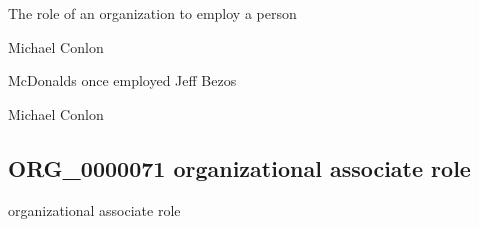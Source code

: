 \documentclass[letterpaper,10pt,english]{sphinxmanual}
\begin{document}
\begin{sphinxShadowBox}

\sphinxAtStartPar
{\hyperref[\detokenize{doc-BFO_0000023::doc}]{}}
\end{sphinxShadowBox}

\begin{sphinxShadowBox}

\sphinxAtStartPar
The role of an organization to employ a person
\end{sphinxShadowBox}

\begin{sphinxShadowBox}

\sphinxAtStartPar
Michael Conlon 
\end{sphinxShadowBox}

\begin{sphinxShadowBox}

\sphinxAtStartPar
McDonalds once employed Jeff Bezos
\end{sphinxShadowBox}

\begin{sphinxShadowBox}

\sphinxAtStartPar
Michael Conlon 
\end{sphinxShadowBox}
\begin{quote}

\ignorespaces \end{quote}


\subsection{ORG\_0000071 \sphinxhyphen{} organizational associate role}
\label{\detokenize{doc-ORG_0000071:org-0000071-organizational-associate-role}}\label{\detokenize{doc-ORG_0000071:index-0}}\label{\detokenize{doc-ORG_0000071::doc}}
\begin{sphinxShadowBox}

\sphinxAtStartPar
organizational associate role
\end{sphinxShadowBox}
\end{document}
